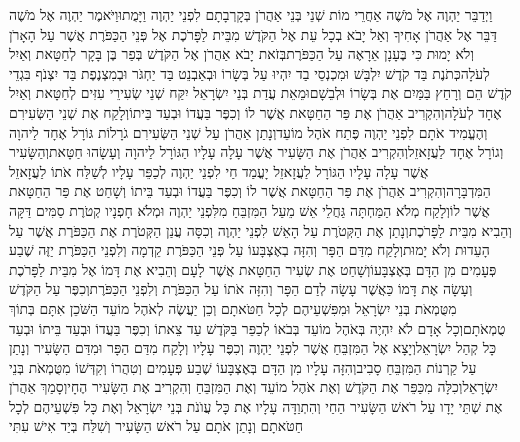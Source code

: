 \documentclass[../main/main.tex]{subfiles}
\begin{document}
\begin{multicols*}{\ncols}
וַיְדַבֵּר יַהְוֶה אֶל מֹשֶׁה אַחֲרֵי מוֹת שְׁנֵי בְּנֵי אַהֲרֹן בְּקָרְבָתָם לִפְנֵי יַהְוֶה וַיָּמֻתוּ\PreVerseSpace{}וַיֹּאמֶר יַהְוֶה אֶל מֹשֶׁה דַּבֵּר אֶל אַהֲרֹן אָחִיךָ וְאַל יָבֹא בְכָל עֵת אֶל הַקֹּדֶשׁ מִבֵּית לַפָּרֹכֶת אֶל פְּנֵי הַכַּפֹּרֶת אֲשֶׁר עַל הָאָרֹן וְלֹא יָמוּת כִּי בֶּעָנָן אֵרָאֶה עַל הַכַּפֹּרֶת\PreVerseSpace{}בְּזֹאת יָבֹא אַהֲרֹן אֶל הַקֹּדֶשׁ בְּפַר בֶּן בָּקָר לְחַטָּאת וְאַיִל לְעֹלָה\PreVerseSpace{}כְּתֹנֶת בַּד קֹדֶשׁ יִלְבָּשׁ וּמִכְנְסֵי בַד יִהְיוּ עַל בְּשָׂרוֹ וּבְאַבְנֵט בַּד יַחְגֹּר וּבְמִצְנֶפֶת בַּד יִצְנֹף בִּגְדֵי קֹדֶשׁ הֵם וְרָחַץ בַּמַּיִם אֶת בְּשָׂרוֹ וּלְבֵשָׁם\PreVerseSpace{}וּמֵאֵת עֲדַת בְּנֵי יִשְׂרָאֵל יִקַּח שְׁנֵי שְׂעִירֵי עִזִּים לְחַטָּאת וְאַיִל אֶחָד לְעֹלָה\PreVerseSpace{}וְהִקְרִיב אַהֲרֹן אֶת פַּר הַחַטָּאת אֲשֶׁר לוֹ וְכִפֶּר בַּעֲדוֹ וּבְעַד בֵּיתוֹ\PreVerseSpace{}וְלָקַח אֶת שְׁנֵי הַשְּׂעִירִם וְהֶעֱמִיד אֹתָם לִפְנֵי יַהְוֶה פֶּתַח אֹהֶל מוֹעֵד\PreVerseSpace{}וְנָתַן אַהֲרֹן עַל שְׁנֵי הַשְּׂעִירִם גֹרָלוֹת גּוֹרָל אֶחָד לַיהוָה וְגוֹרָל אֶחָד לַעֲזָאזֵל\PreVerseSpace{}וְהִקְרִיב אַהֲרֹן אֶת הַשָּׂעִיר אֲשֶׁר עָלָה עָלָיו הַגּוֹרָל לַיהוָה וְעָשָׂהוּ חַטָּאת\PreVerseSpace{}וְהַשָּׂעִיר אֲשֶׁר עָלָה עָלָיו הַגּוֹרָל לַעֲזָאזֵל יָעֳמַד חַי לִפְנֵי יַהְוֶה לְכַפֵּר עָלָיו לְשַׁלַּח אֹתוֹ לַעֲזָאזֵל הַמִּדְבָּרָה\PreVerseSpace{}וְהִקְרִיב אַהֲרֹן אֶת פַּר הַחַטָּאת אֲשֶׁר לוֹ וְכִפֶּר בַּעֲדוֹ וּבְעַד בֵּיתוֹ וְשָׁחַט אֶת פַּר הַחַטָּאת אֲשֶׁר לוֹ\PreVerseSpace{}וְלָקַח מְלֹא הַמַּחְתָּה גַּחֲלֵי אֵשׁ מֵעַל הַמִּזְבֵּחַ מִלִּפְנֵי יַהְוֶה וּמְלֹא חָפְנָיו קְטֹרֶת סַמִּים דַּקָּה וְהֵבִיא מִבֵּית לַפָּרֹכֶת\PreVerseSpace{}וְנָתַן אֶת הַקְּטֹרֶת עַל הָאֵשׁ לִפְנֵי יַהְוֶה וְכִסָּה עֲנַן הַקְּטֹרֶת אֶת הַכַּפֹּרֶת אֲשֶׁר עַל הָעֵדוּת וְלֹא יָמוּת\PreVerseSpace{}וְלָקַח מִדַּם הַפָּר וְהִזָּה בְאֶצְבָּעוֹ עַל פְּנֵי הַכַּפֹּרֶת קֵדְמָה וְלִפְנֵי הַכַּפֹּרֶת יַזֶּה שֶׁבַע פְּעָמִים מִן הַדָּם בְּאֶצְבָּעוֹ\PreVerseSpace{}וְשָׁחַט אֶת שְׂעִיר הַחַטָּאת אֲשֶׁר לָעָם וְהֵבִיא אֶת דָּמוֹ אֶל מִבֵּית לַפָּרֹכֶת וְעָשָׂה אֶת דָּמוֹ כַּאֲשֶׁר עָשָׂה לְדַם הַפָּר וְהִזָּה אֹתוֹ עַל הַכַּפֹּרֶת וְלִפְנֵי הַכַּפֹּרֶת\PreVerseSpace{}וְכִפֶּר עַל הַקֹּדֶשׁ מִטֻּמְאֹת בְּנֵי יִשְׂרָאֵל וּמִפִּשְׁעֵיהֶם לְכָל חַטֹּאתָם וְכֵן יַעֲשֶׂה לְאֹהֶל מוֹעֵד הַשֹּׁכֵן אִתָּם בְּתוֹךְ טֻמְאֹתָם\PreVerseSpace{}וְכָל אָדָם לֹא יִהְיֶה בְּאֹהֶל מוֹעֵד בְּבֹאוֹ לְכַפֵּר בַּקֹּדֶשׁ עַד צֵאתוֹ וְכִפֶּר בַּעֲדוֹ וּבְעַד בֵּיתוֹ וּבְעַד כָּל קְהַל יִשְׂרָאֵל\PreVerseSpace{}וְיָצָא אֶל הַמִּזְבֵּחַ אֲשֶׁר לִפְנֵי יַהְוֶה וְכִפֶּר עָלָיו וְלָקַח מִדַּם הַפָּר וּמִדַּם הַשָּׂעִיר וְנָתַן עַל קַרְנוֹת הַמִּזְבֵּחַ סָבִיב\PreVerseSpace{}וְהִזָּה עָלָיו מִן הַדָּם בְּאֶצְבָּעוֹ שֶׁבַע פְּעָמִים וְטִהֲרוֹ וְקִדְּשׁוֹ מִטֻּמְאֹת בְּנֵי יִשְׂרָאֵל\PreVerseSpace{}וְכִלָּה מִכַּפֵּר אֶת הַקֹּדֶשׁ וְאֶת אֹהֶל מוֹעֵד וְאֶת הַמִּזְבֵּחַ וְהִקְרִיב אֶת הַשָּׂעִיר הֶחָי\PreVerseSpace{}וְסָמַךְ אַהֲרֹן אֶת שְׁתֵּי יָדָו עַל רֹאשׁ הַשָּׂעִיר הַחַי וְהִתְוַדָּה עָלָיו אֶת כָּל עֲוֺנֹת בְּנֵי יִשְׂרָאֵל וְאֶת כָּל פִּשְׁעֵיהֶם לְכָל חַטֹּאתָם וְנָתַן אֹתָם עַל רֹאשׁ הַשָּׂעִיר וְשִׁלַּח בְּיַד אִישׁ עִתִּי 
\end{multicols*}
\end{document}
